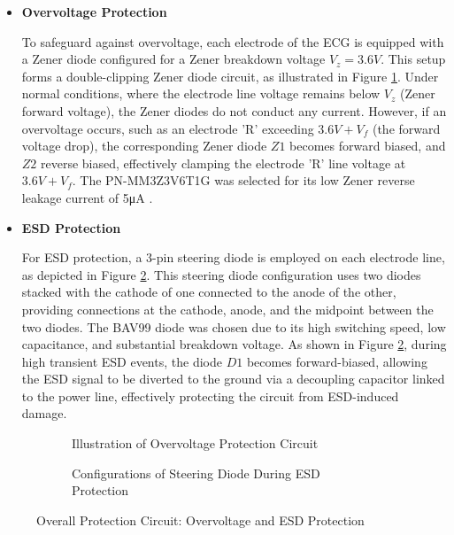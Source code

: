 \begin{itemize}
\item \textbf{Overvoltage Protection}

To safeguard against overvoltage, each electrode of the ECG is equipped with a Zener diode configured for a Zener breakdown voltage \( V_z = 3.6V \). This setup forms a double-clipping Zener diode circuit, as illustrated in Figure \ref{fig:overvoltage_protection}. Under normal conditions, where the electrode line voltage remains below \( V_z \) (Zener forward voltage), the Zener diodes do not conduct any current. However, if an overvoltage occurs, such as an electrode 'R' exceeding \( 3.6V + V_f \) (the forward voltage drop), the corresponding Zener diode \( Z1 \) becomes forward biased, and \( Z2 \) reverse biased, effectively clamping the electrode 'R' line voltage at \( 3.6V + V_f \). The PN-MM3Z3V6T1G was selected for its low Zener reverse leakage current of 5μA \cite{Mouser_MM3Z2V4T1_datasheet}.

\item \textbf{ESD Protection}

For ESD protection, a 3-pin steering diode is employed on each electrode line, as depicted in Figure \ref{fig:esd_protection}. This steering diode configuration uses two diodes stacked with the cathode of one connected to the anode of the other, providing connections at the cathode, anode, and the midpoint between the two diodes. The BAV99 diode was chosen due to its high switching speed, low capacitance, and substantial breakdown voltage. As shown in Figure \ref{fig:esd_protection}, during high transient ESD events, the diode \( D1 \) becomes forward-biased, allowing the ESD signal to be diverted to the ground via a decoupling capacitor linked to the power line, effectively protecting the circuit from ESD-induced damage.
\end{itemize}

\begin{figure}[h]
	\centering
	\begin{subfigure}{0.45\textwidth}
		\centering
		
		\caption{Illustration of Overvoltage Protection Circuit}
		\label{fig:overvoltage_protection}
	\end{subfigure}
	\hfill
	\begin{subfigure}{0.45\textwidth}
		\centering
		
		\caption{Configurations of Steering Diode During ESD Protection}
		\label{fig:esd_protection}
	\end{subfigure}
	\caption{Overall Protection Circuit: Overvoltage and ESD Protection}
	\label{fig:protection_circuit}
\end{figure}

